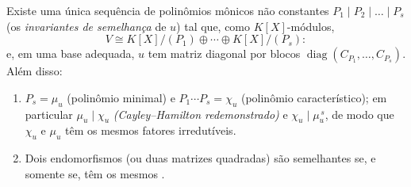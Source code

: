 \begin{theorem}
\label{thm:b3:modules:frobenius}
Existe uma única sequência de polinômios mônicos não constantes $P_1
\mid P_2 \mid \dots \mid P_s$
(os \emph{invariantes de semelhança}
de $u$) tal que, como $K[X]$-módulos,
\[
V \cong K[X]/(P_1) \oplus \cdots \oplus K[X]/(P_s):
\]
e, em uma base adequada, $u$ tem matriz diagonal por blocos $\operatorname{diag}(C_{P_1}, \dots, C_{P_s})$.
Além disso:
\begin{enumerate}
  \item $P_s = \mu_u$ (polinômio minimal) e $P_1\cdots P_s =
        \chi_u$ (polinômio característico);
        em particular $\mu_u
        \mid \chi_u$ \emph{(Cayley--Hamilton redemonstrado)} e
        $\chi_u \mid \mu_u^{\,s}$, de modo que $\chi_u$ e $\mu_u$ têm os mesmos
        fatores irredutíveis.
  \item Dois endomorfismos (ou duas matrizes quadradas) são
        semelhantes se, e somente se, têm os mesmos .
\end{enumerate}
\end{theorem}

